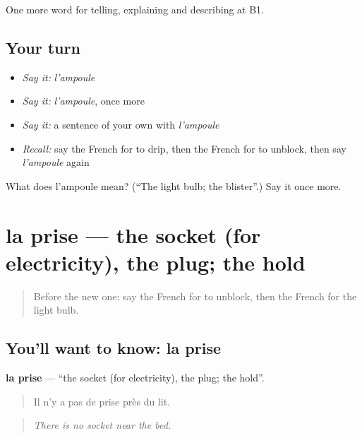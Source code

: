 \begin{grammarlens}[title={What you've built}]
One more word for telling, explaining and describing at B1.
\end{grammarlens}

\subsection*{Your turn}
\begin{itemize}
\raggedright
  \item \emph{Say it:} \emph{l'ampoule}
  \item \emph{Say it:} \emph{l'ampoule}, once more
  \item \emph{Say it:} a sentence of your own with \emph{l'ampoule}
  \item \emph{Recall:} say the French for to drip, then the French for to unblock, then say \emph{l'ampoule} again
\end{itemize}

\begin{tcolorbox}[breakable,colback=teal!4,colframe=teal!35!black,title={Before you move on}]
What does l'ampoule mean? (\textquotedblleft{}The light bulb; the blister\textquotedblright{}.) Say it once more.
\end{tcolorbox}
\section[la prise]{la prise — the socket (for electricity), the plug; the hold}

\label{lesson:FR-C429-prise}



\begin{quote}
Before the new one: say the French for to unblock, then the French for the light bulb.
\end{quote}

\subsection*{You'll want to know: la prise}
\textbf{la prise} — \textquotedblleft{}the socket (for electricity), the plug; the hold\textquotedblright{}.

\begin{quote}
Il n'y a pas de prise près du lit.
\end{quote}

\begin{quote}
\emph{There is no socket near the bed.}
\end{quote}

